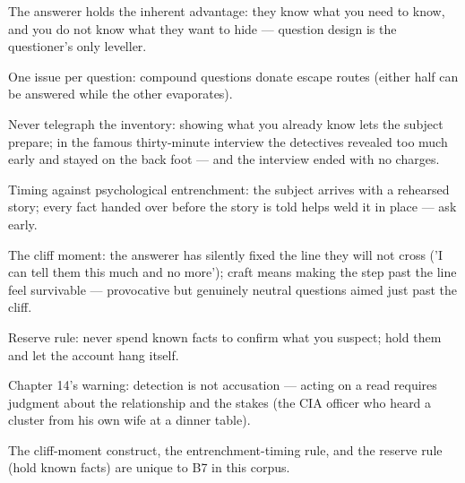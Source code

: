 

\begin{distilled}
  \item The answerer holds the inherent advantage: they know what you need to know, and you do not know what they want to hide --- question design is the questioner's only leveller.
  \item One issue per question: compound questions donate escape routes (either half can be answered while the other evaporates).
  \item Never telegraph the inventory: showing what you already know lets the subject prepare; in the famous thirty-minute interview the detectives revealed too much early and stayed on the back foot --- and the interview ended with no charges.
  \item Timing against psychological entrenchment: the subject arrives with a rehearsed story; every fact handed over before the story is told helps weld it in place --- ask early.
  \item The cliff moment: the answerer has silently fixed the line they will not cross ('I can tell them this much and no more'); craft means making the step past the line feel survivable --- provocative but genuinely neutral questions aimed just past the cliff.
  \item Reserve rule: never spend known facts to confirm what you suspect; hold them and let the account hang itself.
  \item Chapter 14's warning: detection is not accusation --- acting on a read requires judgment about the relationship and the stakes (the CIA officer who heard a cluster from his own wife at a dinner table).
\end{distilled}
\begin{unique}
  \item The cliff-moment construct, the entrenchment-timing rule, and the reserve rule (hold known facts) are unique to B7 in this corpus.
\end{unique}
